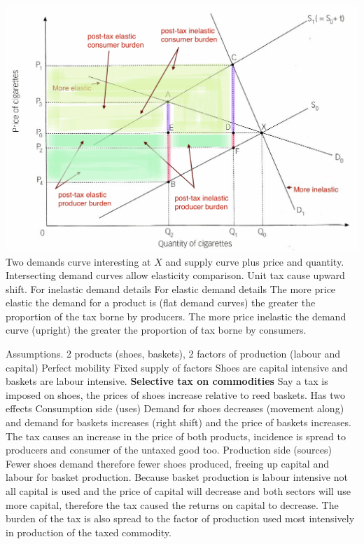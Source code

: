 \documentclass[12pt]{examnotes}
\begin{document}
\includegraphics[scale=0.3]{./imgs/104.jpg}
\ra Two demands curve interesting at $X$ and supply curve plus price and quantity.
\ra Intersecting demand curves allow elasticity comparison. 
\ra Unit tax cause upward shift. 
\ra For inelastic demand details 
\ra For elastic demand details
\ra The more price elastic the demand for a product is (flat demand curves) the greater the proportion of the tax borne by producers.
\ra The more price inelastic the demand curve (upright) the greater the proportion of tax borne by consumers.

\ra Assumptions. 
 2 products (shoes, baskets), 2 factors of production (labour and capital)
 Perfect mobility
 Fixed supply of factors 
 Shoes are capital intensive and baskets are labour intensive.
{\bf Selective tax on commodities}
\ra Say a tax is imposed on shoes, the prices of shoes increase relative to reed baskets.  
\ra Has two effects
 Consumption side (uses)
\rna Demand for shoes decreases (movement along) and demand for baskets increases (right shift) and the price of baskets increases. 
\rna The tax causes an increase in the price of both products, incidence is spread to producers and consumer of the untaxed good too.
 Production side (sources)
\rna Fewer shoes demand therefore fewer shoes produced, freeing up capital and labour for basket production. Because basket production is labour intensive not all capital is used and the price of capital will decrease and both sectors will use more capital, therefore the tax caused the returns on capital to decrease.
\rna The burden of the tax is also spread to the factor of production used most intensively in production of the taxed commodity.
\end{document}
